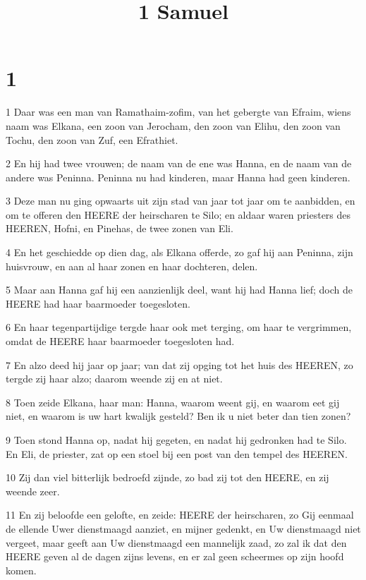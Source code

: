 

\title{1 Samuel}



\chapter{1}

\par 1 Daar was een man van Ramathaim-zofim, van het gebergte van Efraim, wiens naam was Elkana, een zoon van Jerocham, den zoon van Elihu, den zoon van Tochu, den zoon van Zuf, een Efrathiet.
\par 2 En hij had twee vrouwen; de naam van de ene was Hanna, en de naam van de andere was Peninna. Peninna nu had kinderen, maar Hanna had geen kinderen.
\par 3 Deze man nu ging opwaarts uit zijn stad van jaar tot jaar om te aanbidden, en om te offeren den HEERE der heirscharen te Silo; en aldaar waren priesters des HEEREN, Hofni, en Pinehas, de twee zonen van Eli.
\par 4 En het geschiedde op dien dag, als Elkana offerde, zo gaf hij aan Peninna, zijn huisvrouw, en aan al haar zonen en haar dochteren, delen.
\par 5 Maar aan Hanna gaf hij een aanzienlijk deel, want hij had Hanna lief; doch de HEERE had haar baarmoeder toegesloten.
\par 6 En haar tegenpartijdige tergde haar ook met terging, om haar te vergrimmen, omdat de HEERE haar baarmoeder toegesloten had.
\par 7 En alzo deed hij jaar op jaar; van dat zij opging tot het huis des HEEREN, zo tergde zij haar alzo; daarom weende zij en at niet.
\par 8 Toen zeide Elkana, haar man: Hanna, waarom weent gij, en waarom eet gij niet, en waarom is uw hart kwalijk gesteld? Ben ik u niet beter dan tien zonen?
\par 9 Toen stond Hanna op, nadat hij gegeten, en nadat hij gedronken had te Silo. En Eli, de priester, zat op een stoel bij een post van den tempel des HEEREN.
\par 10 Zij dan viel bitterlijk bedroefd zijnde, zo bad zij tot den HEERE, en zij weende zeer.
\par 11 En zij beloofde een gelofte, en zeide: HEERE der heirscharen, zo Gij eenmaal de ellende Uwer dienstmaagd aanziet, en mijner gedenkt, en Uw dienstmaagd niet vergeet, maar geeft aan Uw dienstmaagd een mannelijk zaad, zo zal ik dat den HEERE geven al de dagen zijns levens, en er zal geen scheermes op zijn hoofd komen.
